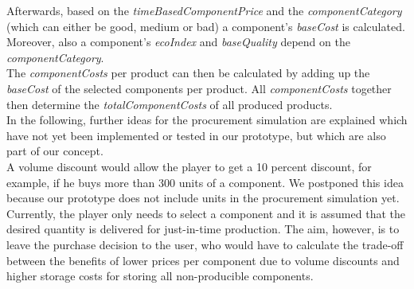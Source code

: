 Afterwards, based on the \textit{timeBasedComponentPrice} and the \textit{componentCategory} (which can either be good, medium or bad) a component's \textit{baseCost} is calculated. Moreover, also a component's \textit{ecoIndex} and \textit{baseQuality} depend on the \textit{componentCategory}.\\
The \textit{componentCosts} per product can then be calculated by adding up the \textit{baseCost} of the selected components per product. All \textit{componentCosts} together then determine the \textit{totalComponentCosts} of all produced products.\\

In the following, further ideas for the procurement simulation are explained which have not yet been implemented or tested in our prototype, but which are also part of our concept.\\
A volume discount would allow the player to get a 10 percent discount, for example, if he buys more than 300 units of a component. We postponed this idea because our prototype does not include units in the procurement simulation yet. Currently, the player only needs to select a component and it is assumed that the desired quantity is delivered for just-in-time production. 
The aim, however, is to leave the purchase decision to the user, who would have to calculate the trade-off between the benefits of lower prices per component due to volume discounts and higher storage costs for storing all non-producible components.